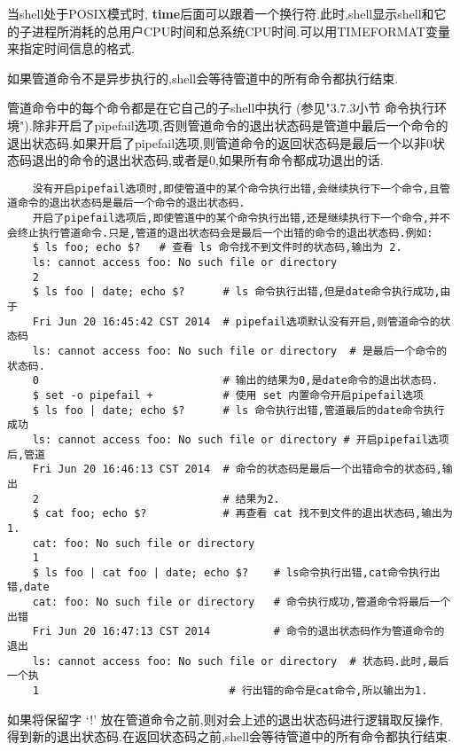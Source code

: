 \documentclass[draft,openany]{book}
\begin{document}
\begin{CJK}{UTF8}{gbsn}
    当shell处于POSIX模式时, \textbf{time}后面可以跟着一个换行符.此时,shell显示shell和它的子进程所消耗的总用户CPU时间和总系统CPU时间.可以用TIMEFORMAT变量来指定时间信息的格式.\par
    如果管道命令不是异步执行的,shell会等待管道中的所有命令都执行结束.\par
    管道命令中的每个命令都是在它自己的子shell中执行 (参见"3.7.3小节 命令执行环境").除非开启了pipefail选项,否则管道命令的退出状态码是管道中最后一个命令的退出状态码.如果开启了pipefail选项,则管道命令的返回状态码是最后一个以非0状态码退出的命令的退出状态码,或者是0,如果所有命令都成功退出的话.
    \begin{verbatim}
    没有开启pipefail选项时,即使管道中的某个命令执行出错,会继续执行下一个命令,且管道命令的退出状态码是最后一个命令的退出状态码.
    开启了pipefail选项后,即使管道中的某个命令执行出错,还是继续执行下一个命令,并不会终止执行管道命令.只是,管道的退出状态码会是最后一个出错的命令的退出状态码.例如:
    $ ls foo; echo $?   # 查看 ls 命令找不到文件时的状态码,输出为 2.
    ls: cannot access foo: No such file or directory
    2
    $ ls foo | date; echo $?      # ls 命令执行出错,但是date命令执行成功,由于
    Fri Jun 20 16:45:42 CST 2014  # pipefail选项默认没有开启,则管道命令的状态码
    ls: cannot access foo: No such file or directory  # 是最后一个命令的状态码.
    0                             # 输出的结果为0,是date命令的退出状态码.
    $ set -o pipefail +           # 使用 set 内置命令开启pipefail选项
    $ ls foo | date; echo $?      # ls 命令执行出错,管道最后的date命令执行成功
    ls: cannot access foo: No such file or directory # 开启pipefail选项后,管道
    Fri Jun 20 16:46:13 CST 2014  # 命令的状态码是最后一个出错命令的状态码,输出
    2                             # 结果为2.
    $ cat foo; echo $?            # 再查看 cat 找不到文件的退出状态码,输出为 1.
    cat: foo: No such file or directory
    1
    $ ls foo | cat foo | date; echo $?    # ls命令执行出错,cat命令执行出错,date
    cat: foo: No such file or directory   # 命令执行成功,管道命令将最后一个出错
    Fri Jun 20 16:47:13 CST 2014          # 命令的退出状态码作为管道命令的退出
    ls: cannot access foo: No such file or directory  # 状态码.此时,最后一个执
    1                              # 行出错的命令是cat命令,所以输出为1.
    \end{verbatim}

    如果将保留字 `!' 放在管道命令之前,则对会上述的退出状态码进行逻辑取反操作,得到新的退出状态码.在返回状态码之前,shell会等待管道中的所有命令都执行结束.


\end{CJK}
\end{document}
